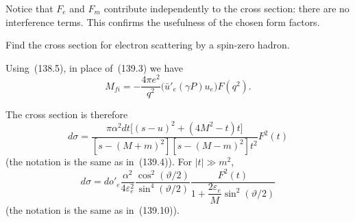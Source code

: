 Notice that $F_e$ and $F_m$ contribute independently to the cross section: there are no interference terms. This confirms the usefulness of the chosen form factors.

\ProblemHeading

Find the cross section for electron scattering by a spin-zero hadron.

\SolutionHeading Using~(138.5), in place of~(139.3) we have
\[
M_{fi}=-\frac{4\pi e^2}{q^2}\bigl(\bar u'_e(\gamma P)u_e\bigr)F(q^2).
\]

The cross section is therefore
\[
d\sigma=\frac{\pi\alpha^2dt\bigl[(s-u)^2+(4M^2-t)t\bigr]}
{[s-(M+m)^2][s-(M-m)^2]t^2}F^2(t)
\]
(the notation is the same as in~(139.4)). For $|t|\gg m^2$,
\[
d\sigma=do'_e\frac{\alpha^2}{4\varepsilon_e^2}
\frac{\cos^2(\vartheta/2)}{\sin^4(\vartheta/2)}
\frac{F^2(t)}{1+\dfrac{2\varepsilon_e}{M}\sin^2(\vartheta/2)}
\]
(the notation is the same as in~(139.10)).
